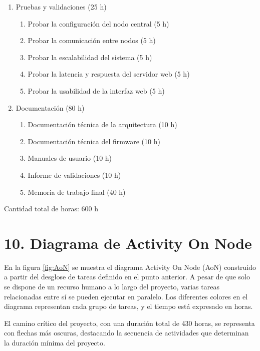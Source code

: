 \documentclass[
11pt, %
]{charter}
\begin{document}
\begin{enumerate}
\item Pruebas y validaciones (25 h)
	\begin{enumerate}
	\item Probar la configuración del nodo central (5 h)
	\item Probar la comunicación entre nodos (5 h)
	\item Probar la escalabilidad del sistema (5 h)
	\item Probar la latencia y respuesta del servidor web (5 h)
	\item Probar la usabilidad de la interfaz web (5 h)
	\end{enumerate}
	
\item Documentación (80 h)
	\begin{enumerate}
	\item Documentación técnica de la arquitectura (10 h)
	\item Documentación técnica del firmware (10 h)
	\item Manuales de usuario (10 h)
	\item Informe de validaciones (10 h)
	\item Memoria de trabajo final (40 h)
	\end{enumerate}
\end{enumerate}

Cantidad total de horas: 600 h

\section{10. Diagrama de Activity On Node}
\label{sec:AoN}

En la figura \ref{fig:AoN} se muestra el diagrama Activity On Node (AoN) construido a partir del desglose de tareas definido en el punto anterior. A pesar de que solo se dispone de un recurso humano a lo largo del proyecto, varias tareas relacionadas entre sí se pueden ejecutar en paralelo. Los diferentes colores en el diagrama representan cada grupo de tareas, y el tiempo está expresado en horas.

El camino crítico del proyecto, con una duración total de 430 horas, se representa con flechas más oscuras, destacando la secuencia de actividades que determinan la duración mínima del proyecto.
\end{document}
